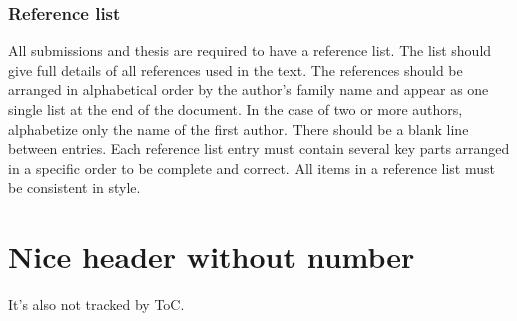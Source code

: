 \subsubsection{Reference list}

All submissions and thesis are required to have a reference list. The list should give full details of all references used in the text. The references should be arranged in alphabetical order by the author’s family name and appear as one single list at the end of the document. In the case of two or more authors, alphabetize only the name of the first author. There should be a blank line between entries. Each reference list entry must contain several key parts arranged in a specific order to be complete and correct. All items in a reference list must be consistent in style.

\section*{Nice header without number}

It's also not tracked by ToC.